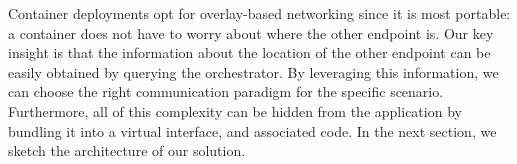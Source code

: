 Container deployments opt for overlay-based networking since it is most
portable: a container does not have to worry about where the other endpoint is.
Our key insight is that the information about the location of the other endpoint
can be easily obtained by querying the orchestrator. By leveraging this
information, we can choose the right communication paradigm for the specific
scenario. Furthermore, all of this complexity can be hidden from the application
by bundling it into a virtual interface, and associated code. In the next
section, we sketch the architecture of our solution.

